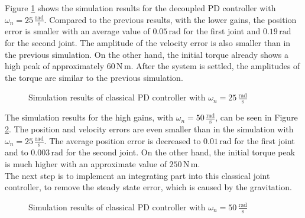 Figure \ref{fig:ch3_sim22} shows the simulation results for the decoupled PD controller with $\omega_n = 25\,\mathrm{\frac{rad}{s}}$. Compared to the previous results, with the lower gains, the position error is smaller with an average value of $0.05\,\mathrm{rad}$ for the first joint and $0.19\,\mathrm{rad}$ for the second joint. The amplitude of the velocity error is also smaller than in the previous simulation. On the other hand, the initial torque already shows a high peak of approximately $60\,\mathrm{N\,m}$. After the system is settled, the amplitudes of the torque are similar to the previous simulation.
\begin{figure}[H]
	\centering
	
	\caption{Simulation results of classical PD controller with $\omega_n = 25\,\mathrm{\frac{rad}{s}}$}
	\label{fig:ch3_sim22}
\end{figure}
The simulation results for the high gains, with $\omega_n = 50\,\mathrm{\frac{rad}{s}}$, can be seen in Figure \ref{fig:ch3_sim23}. The position and velocity errors are even smaller than in the simulation with $\omega_n = 25\,\mathrm{\frac{rad}{s}}$. The average position error is decreased to $0.01\,\mathrm{rad}$ for the first joint and to $0.003\,\mathrm{rad}$ for the second joint. On the other hand, the initial torque peak is much higher with an approximate value of $250\,\mathrm{N\,m}$.\\
The next step is to implement an integrating part into this classical joint controller, to remove the steady state error, which is caused by the gravitation.
\begin{figure}[H]
	\centering
	
	\caption{Simulation results of classical PD controller with $\omega_n = 50\,\mathrm{\frac{rad}{s}}$}
	\label{fig:ch3_sim23}
\end{figure}
